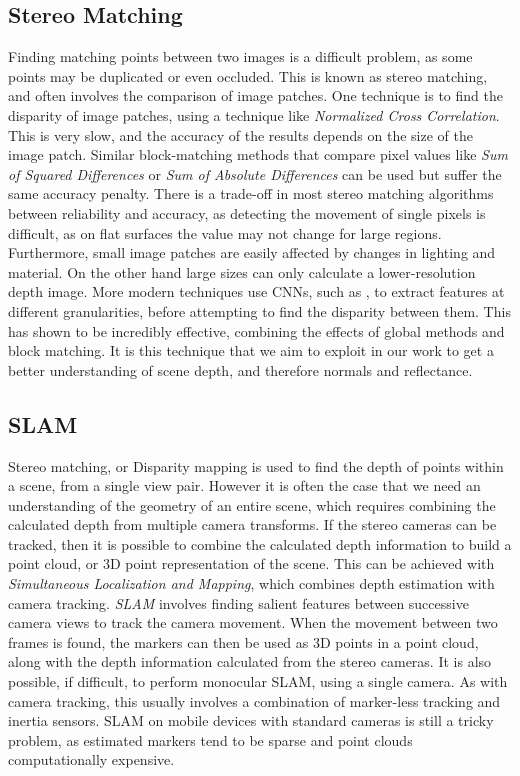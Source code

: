 \documentclass[ %
                    author={Gavin Parker},
                supervisor={Dr. Neill Campbell},
                    degree={MEng},
                     title={Deep Learning for Illumination Estimation from Stereo Images},
                  subtitle={},
                      type={Research},
                      year={2018} ]{dissertation}
\begin{document}
\subsection{Stereo Matching}
Finding matching points between two images is a difficult problem, as some points may be duplicated or even occluded. This is known as stereo matching, and often involves the comparison of image patches. One technique is to find the disparity of image patches, using a technique like \textit{Normalized Cross Correlation}. This is very slow, and the accuracy of the results depends on the size of the image patch. Similar block-matching methods that compare pixel values like \textit{Sum of Squared Differences} or \textit{Sum of Absolute Differences} can be used but suffer the same accuracy penalty. There is a trade-off in most stereo matching algorithms between reliability and accuracy, as detecting the movement of single pixels is difficult, as on flat surfaces the value may not change for large regions. Furthermore, small image patches are easily affected by changes in lighting and material. On the other hand large sizes can only calculate a lower-resolution depth image. More modern techniques use CNNs, such as \cite{7780983}, to extract features at different granularities, before attempting to find the disparity between them. This has shown to be incredibly effective, combining the effects of global methods and block matching. It is this technique that we aim to exploit in our work to get a better understanding of scene depth, and therefore normals and reflectance.
\subsection{SLAM}
Stereo matching, or Disparity mapping is used to find the depth of points within a scene, from a single view pair. However it is often the case that we need an understanding of the geometry of an entire scene, which requires combining the calculated depth from multiple camera transforms. If the stereo cameras can be tracked, then it is possible to combine the calculated depth information to build a point cloud, or 3D point representation of the scene. This can be achieved with \textit{Simultaneous Localization and Mapping}, which combines depth estimation with camera tracking. \textit{SLAM} involves finding salient features between successive camera views to track the camera movement. When the movement between two frames is found, the markers can then be used as 3D points in a point cloud, along with the depth information calculated from the stereo cameras. It is also possible, if difficult, to perform monocular SLAM, using a single camera. As with camera tracking, this usually involves a combination of marker-less tracking and inertia sensors. SLAM on mobile devices with standard cameras is still a tricky problem, as estimated markers tend to be sparse and point clouds computationally expensive.
\end{document}
